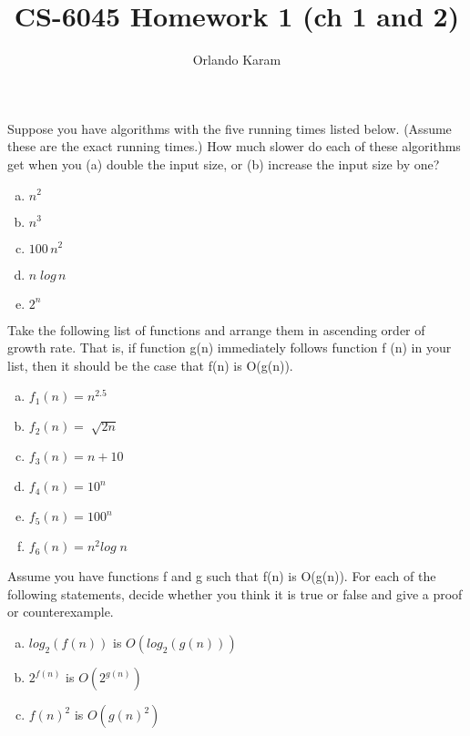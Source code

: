 \documentclass{article}
\title{CS-6045 Homework 1 (ch 1 and 2)}
\author{Orlando Karam}
\begin{document}
\maketitle

\begin{question}[subtitle={Tardos, ch 2 ex 1}]{30}
Suppose you have algorithms with the five running times listed below. (Assume these are the exact running times.) How much slower do each of these algorithms get when you (a) double the input size, or (b) increase the input size by one?
\begin{enumerate}[a)]
	\item{$n^2$}
    \item{$n^3$}
    \item{$100 \, n^2$}
    \item{$n \; log \, n$}
    \item{$2^n$}
\end{enumerate}
\end{question}

\begin{question}[subtitle={Tardos, ch 2 ex 3}]{20}
Take the following list of functions and arrange them in ascending order of growth rate. That is, if function g(n) immediately follows function f (n) in your list, then it should be the case that f(n) is O(g(n)).

\begin{enumerate}[a)]
	\item{$f_1(n) = n^{2.5}$}
	\item{$f_2(n) = \sqrt[]{2n}$}
	\item{$f_3(n) = n+10$}
	\item{$f_4(n) = 10^n$}
	\item{$f_5(n) = 100^n$}
	\item{$f_6(n) = n^2 log\; n$}
\end{enumerate}
\end{question}

\begin{question}[subtitle={Tardos, ch 2 ex 5}]{30}
Assume you have functions f and g such that f(n) is O(g(n)). For each of the following statements, decide whether you think it is true or false and give a proof or counterexample.

\begin{enumerate}[a)]
	\item{$log_2(f(n))$ is $O(log_2(g(n)))$ }
    \item{$2^{f(n)}$ is $O(2^{g(n)})$}
    \item{$f(n)^2$ is $O(g(n)^2)$}
\end{enumerate}
\end{question}
\end{document}
